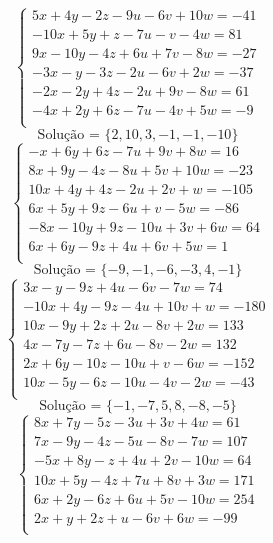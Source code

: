 \documentclass[12pt,oneside,a4paper]{article}
\begin{document}
\vspace{\baselineskip}
\begin{equation*}
\begin{cases}
5x+4y-2z-9u-6v+10w=-41 \\
-10x+5y+z-7u-v-4w=81 \\
9x-10y-4z+6u+7v-8w=-27 \\
-3x-y-3z-2u-6v+2w=-37 \\
-2x-2y+4z-2u+9v-8w=61 \\
-4x+2y+6z-7u-4v+5w=-9 \\
\end{cases}
\end{equation*}
\begin{equation*}
\text{Solução = }\{2,10,3,-1,-1,-10\}
\end{equation*}
\vspace{\baselineskip}
\begin{equation*}
\begin{cases}
-x+6y+6z-7u+9v+8w=16 \\
8x+9y-4z-8u+5v+10w=-23 \\
10x+4y+4z-2u+2v+w=-105 \\
6x+5y+9z-6u+v-5w=-86 \\
-8x-10y+9z-10u+3v+6w=64 \\
6x+6y-9z+4u+6v+5w=1 \\
\end{cases}
\end{equation*}
\begin{equation*}
\text{Solução = }\{-9,-1,-6,-3,4,-1\}
\end{equation*}
\vspace{\baselineskip}
\begin{equation*}
\begin{cases}
3x-y-9z+4u-6v-7w=74 \\
-10x+4y-9z-4u+10v+w=-180 \\
10x-9y+2z+2u-8v+2w=133 \\
4x-7y-7z+6u-8v-2w=132 \\
2x+6y-10z-10u+v-6w=-152 \\
10x-5y-6z-10u-4v-2w=-43 \\
\end{cases}
\end{equation*}
\begin{equation*}
\text{Solução = }\{-1,-7,5,8,-8,-5\}
\end{equation*}
\vspace{\baselineskip}
\begin{equation*}
\begin{cases}
8x+7y-5z-3u+3v+4w=61 \\
7x-9y-4z-5u-8v-7w=107 \\
-5x+8y-z+4u+2v-10w=64 \\
10x+5y-4z+7u+8v+3w=171 \\
6x+2y-6z+6u+5v-10w=254 \\
2x+y+2z+u-6v+6w=-99 \\
\end{cases}
\end{equation*}
\end{document}
